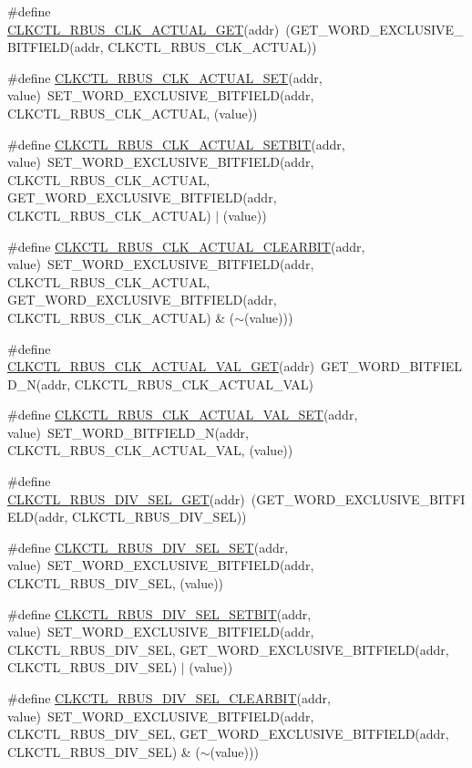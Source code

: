 \begin{DoxyCompactItemize}
\item 
\#define \hyperlink{a00544_a992d6832d841506fe636ef4ee851a812}{CLKCTL\_\-RBUS\_\-CLK\_\-ACTUAL\_\-GET}(addr)~(GET\_\-WORD\_\-EXCLUSIVE\_\-BITFIELD(addr, CLKCTL\_\-RBUS\_\-CLK\_\-ACTUAL))
\item 
\#define \hyperlink{a00544_a6816f33d17edadd949ace8d46ca8c333}{CLKCTL\_\-RBUS\_\-CLK\_\-ACTUAL\_\-SET}(addr, value)~SET\_\-WORD\_\-EXCLUSIVE\_\-BITFIELD(addr, CLKCTL\_\-RBUS\_\-CLK\_\-ACTUAL, (value))
\item 
\#define \hyperlink{a00544_a4505a82d5ebb208852fd85d1a9f1e861}{CLKCTL\_\-RBUS\_\-CLK\_\-ACTUAL\_\-SETBIT}(addr, value)~SET\_\-WORD\_\-EXCLUSIVE\_\-BITFIELD(addr, CLKCTL\_\-RBUS\_\-CLK\_\-ACTUAL, GET\_\-WORD\_\-EXCLUSIVE\_\-BITFIELD(addr, CLKCTL\_\-RBUS\_\-CLK\_\-ACTUAL) $|$ (value))
\item 
\#define \hyperlink{a00544_abce0cfdf7b84f9c691d86bf8178648c6}{CLKCTL\_\-RBUS\_\-CLK\_\-ACTUAL\_\-CLEARBIT}(addr, value)~SET\_\-WORD\_\-EXCLUSIVE\_\-BITFIELD(addr, CLKCTL\_\-RBUS\_\-CLK\_\-ACTUAL, GET\_\-WORD\_\-EXCLUSIVE\_\-BITFIELD(addr, CLKCTL\_\-RBUS\_\-CLK\_\-ACTUAL) \& ($\sim$(value)))
\item 
\#define \hyperlink{a00544_ad006c55d01b7c2e1626b491a8dc66493}{CLKCTL\_\-RBUS\_\-CLK\_\-ACTUAL\_\-VAL\_\-GET}(addr)~GET\_\-WORD\_\-BITFIELD\_\-N(addr, CLKCTL\_\-RBUS\_\-CLK\_\-ACTUAL\_\-VAL)
\item 
\#define \hyperlink{a00544_a2f488b7a185f3d1dffb08be8c53a4a4f}{CLKCTL\_\-RBUS\_\-CLK\_\-ACTUAL\_\-VAL\_\-SET}(addr, value)~SET\_\-WORD\_\-BITFIELD\_\-N(addr, CLKCTL\_\-RBUS\_\-CLK\_\-ACTUAL\_\-VAL, (value))
\item 
\#define \hyperlink{a00544_a59f4be51a0f5fd4f79a0d8f7b9208430}{CLKCTL\_\-RBUS\_\-DIV\_\-SEL\_\-GET}(addr)~(GET\_\-WORD\_\-EXCLUSIVE\_\-BITFIELD(addr, CLKCTL\_\-RBUS\_\-DIV\_\-SEL))
\item 
\#define \hyperlink{a00544_a25670457993d62f0268357d4fb43ecfc}{CLKCTL\_\-RBUS\_\-DIV\_\-SEL\_\-SET}(addr, value)~SET\_\-WORD\_\-EXCLUSIVE\_\-BITFIELD(addr, CLKCTL\_\-RBUS\_\-DIV\_\-SEL, (value))
\item 
\#define \hyperlink{a00544_a8632d309fc6ad44dc3faad91346f3362}{CLKCTL\_\-RBUS\_\-DIV\_\-SEL\_\-SETBIT}(addr, value)~SET\_\-WORD\_\-EXCLUSIVE\_\-BITFIELD(addr, CLKCTL\_\-RBUS\_\-DIV\_\-SEL, GET\_\-WORD\_\-EXCLUSIVE\_\-BITFIELD(addr, CLKCTL\_\-RBUS\_\-DIV\_\-SEL) $|$ (value))
\item 
\#define \hyperlink{a00544_a71ca37989d3e0fc22c155e6b11cf2e73}{CLKCTL\_\-RBUS\_\-DIV\_\-SEL\_\-CLEARBIT}(addr, value)~SET\_\-WORD\_\-EXCLUSIVE\_\-BITFIELD(addr, CLKCTL\_\-RBUS\_\-DIV\_\-SEL, GET\_\-WORD\_\-EXCLUSIVE\_\-BITFIELD(addr, CLKCTL\_\-RBUS\_\-DIV\_\-SEL) \& ($\sim$(value)))

\end{DoxyCompactItemize}

